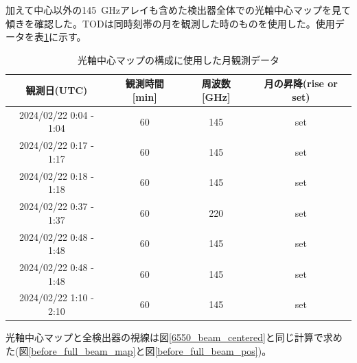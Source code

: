 加えて中心以外の\SI{145}{GHz}アレイも含めた検出器全体での光軸中心マップを見て傾きを確認した。TODは同時刻帯の月を観測した時のものを使用した。使用データを表\ref{before_full_array_table}に示す。
\begin{table}[htbp]
  \centering
  \caption{光軸中心マップの構成に使用した月観測データ}
  \vspace{3mm}
  \begin{tabular}{cccc} \hline\hline
    観測日(UTC) & 観測時間 [min] & 周波数 [GHz] & 月の昇降(rise or set) \\ \hline
    2024/02/22 0:04 - 1:04 & 60 & 145 & set \\
    2024/02/22 0:17 - 1:17 & 60 & 145 & set \\
    2024/02/22 0:18 - 1:18 & 60 & 145 & set \\
    2024/02/22 0:37 - 1:37 & 60 & 220 & set \\
    2024/02/22 0:48 - 1:48 & 60 & 145 & set \\
    2024/02/22 0:48 - 1:48 & 60 & 145 & set \\
    2024/02/22 1:10 - 2:10 & 60 & 145 & set \\ \hline\hline

  \end{tabular}
  \label{before_full_array_table}
\end{table}
光軸中心マップと全検出器の視線は図\ref{6550_beam_centered}と同じ計算で求めた(図\ref{before_full_beam_map}と図\ref{before_full_beam_pos})。
